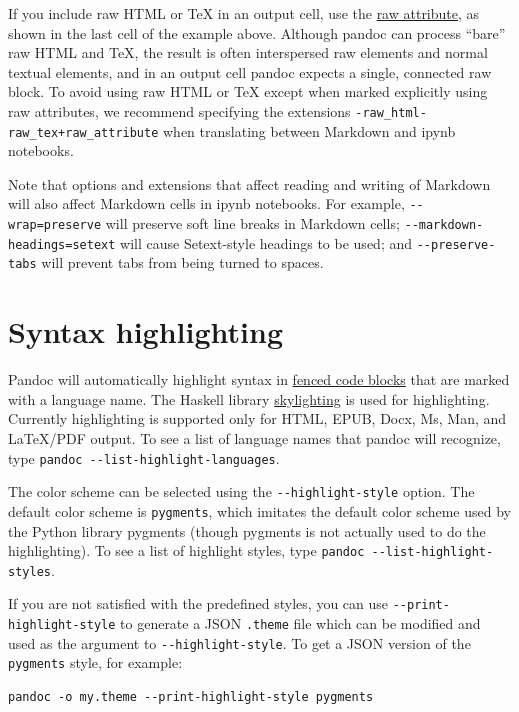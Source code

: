 \documentclass[
  b5paper
]{book}
\begin{document}
If you include raw HTML or TeX in an output cell, use the
\hyperref[extension-raw_attribute]{raw attribute}, as shown in the last
cell of the example above. Although pandoc can process ``bare'' raw HTML
and TeX, the result is often interspersed raw elements and normal
textual elements, and in an output cell pandoc expects a single,
connected raw block. To avoid using raw HTML or TeX except when marked
explicitly using raw attributes, we recommend specifying the extensions
\texttt{-raw\_html-raw\_tex+raw\_attribute} when translating between
Markdown and ipynb notebooks.

Note that options and extensions that affect reading and writing of
Markdown will also affect Markdown cells in ipynb notebooks. For
example, \texttt{-\/-wrap=preserve} will preserve soft line breaks in
Markdown cells; \texttt{-\/-markdown-headings=setext} will cause
Setext-style headings to be used; and \texttt{-\/-preserve-tabs} will
prevent tabs from being turned to spaces.

\chapter{Syntax highlighting}\label{syntax-highlighting}

Pandoc will automatically highlight syntax in
\hyperref[fenced-code-blocks]{fenced code blocks} that are marked with a
language name. The Haskell library
\href{https://github.com/jgm/skylighting}{skylighting} is used for
highlighting. Currently highlighting is supported only for HTML, EPUB,
Docx, Ms, Man, and LaTeX/PDF output. To see a list of language names
that pandoc will recognize, type
\texttt{pandoc\ -\/-list-highlight-languages}.

The color scheme can be selected using the \texttt{-\/-highlight-style}
option. The default color scheme is \texttt{pygments}, which imitates
the default color scheme used by the Python library pygments (though
pygments is not actually used to do the highlighting). To see a list of
highlight styles, type \texttt{pandoc\ -\/-list-highlight-styles}.

If you are not satisfied with the predefined styles, you can use
\texttt{-\/-print-highlight-style} to generate a JSON \texttt{.theme}
file which can be modified and used as the argument to
\texttt{-\/-highlight-style}. To get a JSON version of the
\texttt{pygments} style, for example:

\begin{verbatim}
pandoc -o my.theme --print-highlight-style pygments
\end{verbatim}
\end{document}
